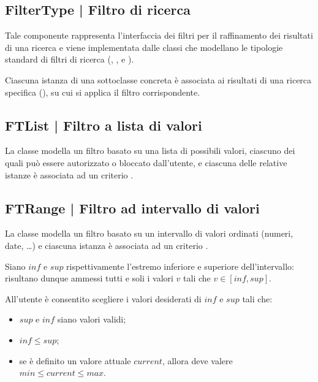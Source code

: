 \documentclass[10pt,a4paper,headinclude,footinclude,hidelinks]{scrreprt} %
\begin{document}
	\subsection[FilterType]{FilterType | Filtro di ricerca}
	\label{sec:stage:design:sistema:model.filter:filter}
	Tale componente rappresenta l'interfaccia dei filtri per il raffinamento dei risultati di una ricerca e viene implementata dalle classi che modellano le tipologie standard di filtri di ricerca (\textit{}, \textit{}, \textit{} e \textit{}).
	
	Ciascuna istanza di una sottoclasse concreta è associata ai risultati di una ricerca specifica (\textit{}), su cui si applica il filtro corrispondente.

	\subsection[FTList]{FTList | Filtro a lista di valori}
	\label{sec:stage:design:sistema:model.filter:list-filter}
	La classe \textit{} modella un filtro basato su una lista di possibili valori, ciascuno dei quali può essere autorizzato o bloccato dall'utente, e ciascuna delle relative istanze è associata ad un criterio \textit{}.

	\subsection[FTRange]{FTRange | Filtro ad intervallo di valori}
	\label{sec:stage:design:sistema:model.filter:range-filter}
	La classe \textit{} modella un filtro basato su un intervallo di valori ordinati (numeri, date, \ldots) e ciascuna istanza è associata ad un criterio \textit{}.

	Siano $inf$ e $sup$ rispettivamente l'estremo inferiore e superiore dell'intervallo: risultano dunque ammessi tutti e soli i valori $v$ tali che $v \in \left[inf,sup\right]$.

	All'utente è consentito scegliere i valori desiderati di $inf$ e $sup$ tali che:
	\begin{itemize}
	\item $sup$ e $inf$ siano valori validi;
	\item $inf \leq sup$;
	\item se è definito un valore attuale $current$, allora deve valere $min \leq current \leq max$.
	\end{itemize}
\end{document}
